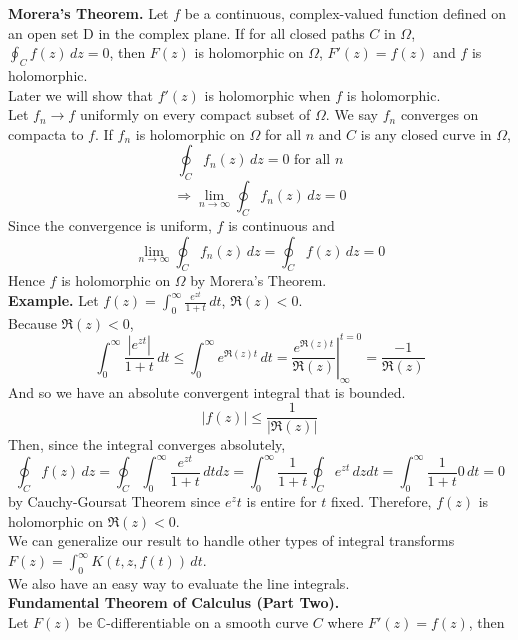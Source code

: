 \documentclass[11pt]{article}
\newcommand*\Eval[3]{\left.#1\right\rvert_{#2}^{#3}}
\begin{document}
\newline
\newline
\textbf{Morera's Theorem.} Let $f$ be a continuous, complex-valued function defined on an open set D in the complex plane. If for all closed paths $C$ in $\Omega$, $\oint_C f(z) \,dz = 0$, then $F(z)$ is holomorphic on $\Omega$, $F'(z) = f(z)$ and $f$ is holomorphic. \\
Later we will show that $f'(z)$ is holomorphic when $f$ is holomorphic. \\
\newline
Let $f_n \to f$ uniformly on every compact subset of $\Omega$. We say $f_n$ converges on compacta to $f$. If $f_n$ is holomorphic on $\Omega$ for all $n$ and $C$ is any closed curve in $\Omega$, 
\begin{equation*}
\oint_C f_n(z) \,dz = 0 \mbox{ for all } n
\end{equation*}
$$\Rightarrow \lim_{n\to \infty}{\oint_Cf_n(z) \, dz} = 0$$
Since the convergence is uniform, $f$ is continuous and 
$$ \lim_{n\to \infty}{\oint_C f_n(z) \,dz} = \oint_C f(z) \, dz = 0$$
Hence $f$ is holomorphic on $\Omega$ by Morera's Theorem. \\
\newline 
\textbf{Example.} Let $f(z) = \int_0^{\infty} \frac{e^{zt}}{1 + t} \, dt$, $\Re(z) < 0$. \\
Because $\Re(z) < 0$, 
$$\int_0^{\infty} \frac{|e^{zt}|}{1 + t} \,dt \leqslant \int_0^{\infty} e^{\Re(z)t} \,dt = \Eval{\frac{e^{\Re(z)t}}{\Re(z)}}{\infty}{t = 0} = \frac{-1}{\Re(z)}$$
And so we have an absolute convergent integral that is bounded. 
$$|f(z)| \leqslant \frac{1}{|\Re(z)|}$$
Then, since the integral converges absolutely,
$$\oint_C f(z) \,dz = \oint_C \int_0^{\infty} \frac{e^{zt}}{1 + t}\,dtdz = \int_0^{\infty} \frac{1}{1+t} \oint_C e^{zt} \,dzdt = \int_0^{\infty} \frac{1}{1+t}0 \,dt = 0$$
by Cauchy-Goursat Theorem since $e^zt$ is entire for $t$ fixed. Therefore, $f(z)$ is holomorphic on $\Re(z) < 0$. \\
\newline 
We can generalize our result to handle other types of integral transforms $F(z) = \int_0^{\infty} K(t, z, f(t)) \,dt$. \\
We also have an easy way to evaluate the line integrals. \\
\newline
\textbf{Fundamental Theorem of Calculus (Part Two).} \\
Let $F(z)$ be $\mathbb{C}$-differentiable on a smooth curve $C$ where $F'(z) = f(z)$, then
\end{document}

